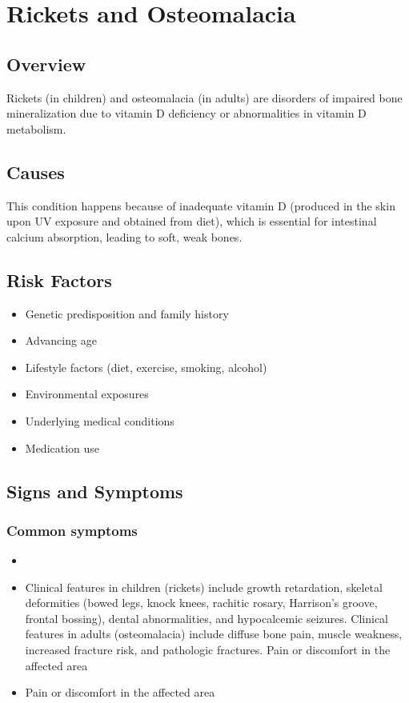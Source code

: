 \chapter{Rickets and Osteomalacia}
\label{sec:Rickets and Osteomalacia}

\section{Overview}
Rickets (in children) and osteomalacia (in adults) are disorders of impaired bone mineralization due to vitamin D deficiency or abnormalities in vitamin D metabolism.
\section{Causes}
This condition happens because of inadequate vitamin D (produced in the skin upon UV exposure and obtained from diet), which is essential for intestinal calcium absorption, leading to soft, weak bones.     
\section{Risk Factors}

\begin{itemize}[noitemsep]
  \item Genetic predisposition and family history
  \item Advancing age
  \item Lifestyle factors (diet, exercise, smoking, alcohol)
  \item Environmental exposures
  \item Underlying medical conditions
  \item Medication use
\end{itemize}
\section{Signs and Symptoms}

\subsection{Common symptoms}
\begin{itemize}[noitemsep]
  \item \item Clinical features in children (rickets) include growth retardation, skeletal deformities (bowed legs, knock knees, rachitic rosary, Harrison's groove, frontal bossing), dental abnormalities, and hypocalcemic seizures. Clinical features in adults (osteomalacia) include diffuse bone pain, muscle weakness, increased fracture risk, and pathologic fractures. Pain or discomfort in the affected area    \item Pain or discomfort in the affected area
  \end{itemize}

